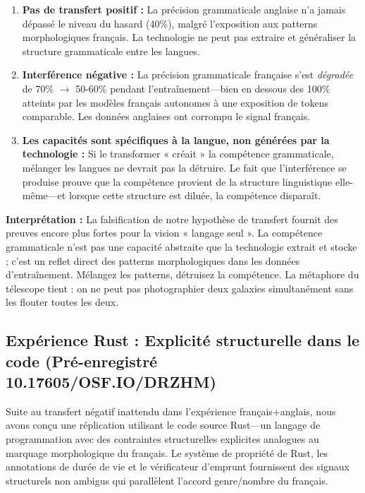 \documentclass[11pt,a4paper]{article}
\begin{document}
\begin{enumerate}
    \item \textbf{Pas de transfert positif :} La précision grammaticale anglaise n'a jamais dépassé le niveau du hasard (40\%), malgré l'exposition aux patterns morphologiques français. La technologie ne peut pas extraire et généraliser la structure grammaticale entre les langues.

    \item \textbf{Interférence négative :} La précision grammaticale française s'est \textit{dégradée} de 70\% $\rightarrow$ 50-60\% pendant l'entraînement---bien en dessous des 100\% atteints par les modèles français autonomes à une exposition de tokens comparable. Les données anglaises ont corrompu le signal français.

    \item \textbf{Les capacités sont spécifiques à la langue, non générées par la technologie :} Si le transformer « créait » la compétence grammaticale, mélanger les langues ne devrait pas la détruire. Le fait que l'interférence se produise prouve que la compétence provient de la structure linguistique elle-même---et lorsque cette structure est diluée, la compétence disparaît.
\end{enumerate}

\textbf{Interprétation :} La falsification de notre hypothèse de transfert fournit des preuves encore plus fortes pour la vision « langage seul ». La compétence grammaticale n'est pas une capacité abstraite que la technologie extrait et stocke ; c'est un reflet direct des patterns morphologiques dans les données d'entraînement. Mélangez les patterns, détruisez la compétence. La métaphore du télescope tient : on ne peut pas photographier deux galaxies simultanément sans les flouter toutes les deux.

\subsection{Expérience Rust : Explicité structurelle dans le code (Pré-enregistré 10.17605/OSF.IO/DRZHM)}

Suite au transfert négatif inattendu dans l'expérience français+anglais, nous avons conçu une réplication utilisant le code source Rust---un langage de programmation avec des contraintes structurelles explicites analogues au marquage morphologique du français. Le système de propriété de Rust, les annotations de durée de vie et le vérificateur d'emprunt fournissent des signaux structurels non ambigus qui parallèlent l'accord genre/nombre du français.
\end{document}
